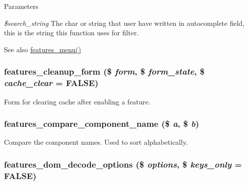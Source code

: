 \begin{DoxyParams}{Parameters}
\item[{\em \$search\_\-string}]The char or string that user have written in autocomplete field, this is the string this function uses for filter.\end{DoxyParams}
\begin{DoxySeeAlso}{See also}
\hyperlink{features_8module_a2f3b3fc6d67373f91feb6e2e9d45c0f0}{features\_\-menu()} 
\end{DoxySeeAlso}
\hypertarget{features_8admin_8inc_ab9ed5d0e49a2ed5a61db90436d44f06f}{
\subsubsection[{features\_\-cleanup\_\-form}]{\setlength{\rightskip}{0pt plus 5cm}features\_\-cleanup\_\-form (\$ {\em form}, \/  \$ {\em form\_\-state}, \/  \$ {\em cache\_\-clear} = {\ttfamily FALSE})}}
\label{features_8admin_8inc_ab9ed5d0e49a2ed5a61db90436d44f06f}
Form for clearing cache after enabling a feature. \hypertarget{features_8admin_8inc_aacaefdede8dd5662e94053f3fc2bfd99}{
\subsubsection[{features\_\-compare\_\-component\_\-name}]{\setlength{\rightskip}{0pt plus 5cm}features\_\-compare\_\-component\_\-name (\$ {\em a}, \/  \$ {\em b})}}
\label{features_8admin_8inc_aacaefdede8dd5662e94053f3fc2bfd99}
Compare the component names. Used to sort alphabetically. \hypertarget{features_8admin_8inc_a345c3750b3d43f179d47f4346b4b24d4}{
\subsubsection[{features\_\-dom\_\-decode\_\-options}]{\setlength{\rightskip}{0pt plus 5cm}features\_\-dom\_\-decode\_\-options (\$ {\em options}, \/  \$ {\em keys\_\-only} = {\ttfamily FALSE})}}
